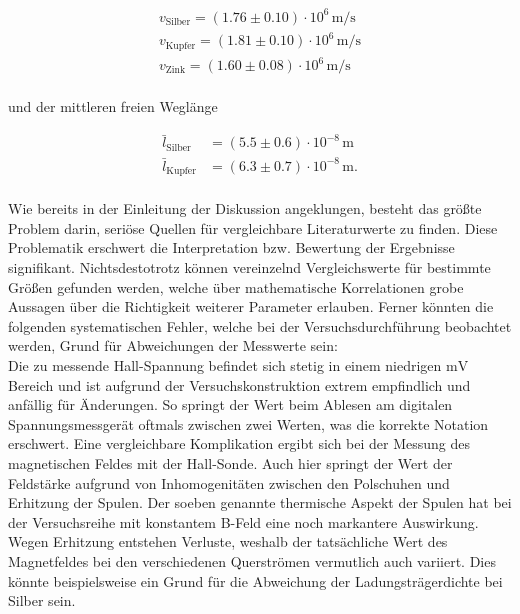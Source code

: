 \begin{align*}
    v_\text{Silber} = \left(1.76\pm0.10\right)\cdot10^{6}\,\unit{\meter\per\second}\\
    v_\text{Kupfer} = \left(1.81\pm0.10\right)\cdot10^{6}\,\unit{\meter\per\second}\\
    v_\text{Zink} = \left(1.60\pm0.08\right)\cdot10^{6}\,\unit{\meter\per\second}\\
\end{align*}

\noindent und der mittleren freien Weglänge

\begin{align*}
    \bar{l}_\text{Silber} &= \left(5.5\pm0.6\right)\cdot10^{-8}\,\unit{\meter}\\
    \bar{l}_\text{Kupfer} &= \left(6.3\pm0.7\right)\cdot10^{-8}\,\unit{\meter}.\\
\end{align*}

\noindent Wie bereits in der Einleitung der Diskussion angeklungen, besteht das größte Problem darin, seriöse 
Quellen für vergleichbare Literaturwerte zu finden. Diese Problematik erschwert die Interpretation bzw. Bewertung 
der Ergebnisse signifikant. Nichtsdestotrotz können vereinzelnd Vergleichswerte für bestimmte Größen gefunden werden, 
welche über mathematische Korrelationen grobe Aussagen über die Richtigkeit weiterer Parameter erlauben. Ferner 
könnten die folgenden systematischen Fehler, welche bei der Versuchsdurchführung beobachtet werden, Grund für 
Abweichungen der Messwerte sein:\\

\noindent Die zu messende Hall-Spannung befindet sich stetig in einem niedrigen $\unit{\milli\volt}$ Bereich und ist 
aufgrund der Versuchskonstruktion extrem empfindlich und anfällig für Änderungen. So springt der Wert beim Ablesen am 
digitalen Spannungsmessgerät oftmals zwischen zwei Werten, was die korrekte Notation erschwert. Eine vergleichbare Komplikation 
ergibt sich bei der Messung des magnetischen Feldes mit der Hall-Sonde. Auch hier springt der Wert der Feldstärke 
aufgrund von Inhomogenitäten zwischen den Polschuhen und Erhitzung der Spulen. Der soeben genannte thermische Aspekt 
der Spulen hat bei der Versuchsreihe mit konstantem B-Feld eine noch markantere Auswirkung. Wegen Erhitzung entstehen 
Verluste, weshalb der tatsächliche Wert des Magnetfeldes bei den verschiedenen Querströmen vermutlich auch variiert.
Dies könnte beispielsweise ein Grund für die Abweichung der Ladungsträgerdichte bei Silber sein.  

